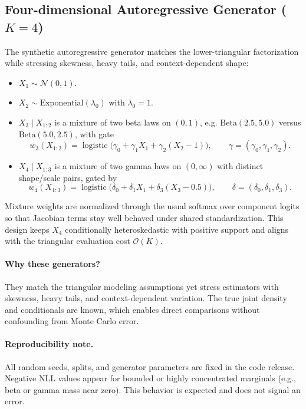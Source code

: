 \documentclass[11pt,a4paper,twoside]{book}\usepackage[]{graphicx}\usepackage[]{xcolor}
\begin{document}
\subsection{Four-dimensional Autoregressive Generator ($K=4$)}
The synthetic autoregressive generator matches the lower-triangular factorization while stressing skewness, heavy tails, and context-dependent shape:
\begin{itemize}
 \item $X_1 \sim \mathcal{N}(0,1)$.
 \item $X_2 \sim \mathrm{Exponential}(\lambda_0)$ with $\lambda_0 = 1$.
 \item $X_3 \mid X_{1:2}$ is a mixture of two beta laws on $(0,1)$, e.g. $\mathrm{Beta}(2.5, 5.0)$ versus $\mathrm{Beta}(5.0, 2.5)$, with gate
 \[ 
 w_3(X_{1:2}) = \operatorname{logistic}\big(\gamma_0 + \gamma_1 X_1 + \gamma_2 (X_2 - 1)\big), \qquad \gamma = (\gamma_0, \gamma_1, \gamma_2).
 \]
 \item $X_4 \mid X_{1:3}$ is a mixture of two gamma laws on $(0, \infty)$ with distinct shape/scale pairs, gated by
 \[ 
 w_4(X_{1:3}) = \operatorname{logistic}\big(\delta_0 + \delta_1 X_1 + \delta_3 (X_3 - 0.5)\big), \qquad \delta = (\delta_0, \delta_1, \delta_3).
 \]
\end{itemize}
Mixture weights are normalized through the usual softmax over component logits so that Jacobian terms stay well behaved under shared standardization. This design keeps $X_4$ conditionally heteroskedastic with positive support and aligns with the triangular evaluation cost $\mathcal{O}(K)$.

\paragraph{Why these generators?}
They match the triangular modeling assumptions yet stress estimators with skewness, heavy tails, and context-dependent variation. The true joint density and conditionals are known, which enables direct comparisons without confounding from Monte Carlo error.

\paragraph{Reproducibility note.}
All random seeds, splits, and generator parameters are fixed in the code release. Negative NLL values appear for bounded or highly concentrated marginals (e.g., beta or gamma mass near zero). This behavior is expected and does not signal an error.
\end{document}
